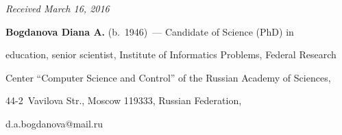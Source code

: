 







\vspace*{-1pt}





\hfill{\small\textit{Received March 16, 2016}}


  





\Contrl





\noindent


\textbf{Bogdanova Diana A.} (b.\ 1946)~--- Candidate of Science (PhD) in 


education, senior scientist, Institute of Informatics Problems, Federal Research 


Center ``Computer Science and Control'' of the Russian Academy of Sciences, 


44-2~Vavilova Str., Moscow 119333, Russian Federation, 


d.a.bogdanova@mail.ru





\label{end\stat}








\renewcommand{\bibname}{\protect\rm Литература}


